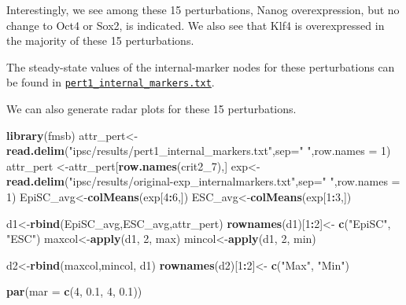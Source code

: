 \documentclass[
]{book}
\newenvironment{Shaded}{\begin{snugshade}}{\end{snugshade}}
\newcommand{\DataTypeTok}[1]{\textcolor[rgb]{0.13,0.29,0.53}{#1}}
\newcommand{\DecValTok}[1]{\textcolor[rgb]{0.00,0.00,0.81}{#1}}
\newcommand{\FloatTok}[1]{\textcolor[rgb]{0.00,0.00,0.81}{#1}}
\newcommand{\KeywordTok}[1]{\textcolor[rgb]{0.13,0.29,0.53}{\textbf{#1}}}
\newcommand{\NormalTok}[1]{#1}
\newcommand{\OperatorTok}[1]{\textcolor[rgb]{0.81,0.36,0.00}{\textbf{#1}}}
\newcommand{\StringTok}[1]{\textcolor[rgb]{0.31,0.60,0.02}{#1}}
\begin{document}
Interestingly, we see among these 15 perturbations, Nanog overexpression, but no change to Oct4 or Sox2, is indicated. We also see that Klf4 is overexpressed in the majority of these 15 perturbations.

The steady-state values of the internal-marker nodes for these perturbations can be found in \href{https://github.com/VeraLiconaResearchGroup/Netisce/blob/main/ipsc_validation/results/pert1_internal_markers.txt}{\texttt{pert1\_internal\_markers.txt}}.

We can also generate radar plots for these 15 perturbations.

\begin{Shaded}
\begin{Highlighting}[]
\KeywordTok{library}\NormalTok{(fmsb)}
\NormalTok{attr_pert<-}\KeywordTok{read.delim}\NormalTok{(}\StringTok{"ipsc/results/pert1_internal_markers.txt"}\NormalTok{,}\DataTypeTok{sep=}\StringTok{" "}\NormalTok{,}\DataTypeTok{row.names =} \DecValTok{1}\NormalTok{)}
\NormalTok{attr_pert <-attr_pert[}\KeywordTok{row.names}\NormalTok{(crit2_}\DecValTok{7}\NormalTok{),]}
\NormalTok{exp<-}\KeywordTok{read.delim}\NormalTok{(}\StringTok{"ipsc/results/original-exp_internalmarkers.txt"}\NormalTok{,}\DataTypeTok{sep=}\StringTok{" "}\NormalTok{,}\DataTypeTok{row.names =} \DecValTok{1}\NormalTok{)}
\NormalTok{EpiSC_avg<-}\KeywordTok{colMeans}\NormalTok{(exp[}\DecValTok{4}\OperatorTok{:}\DecValTok{6}\NormalTok{,])}
\NormalTok{ESC_avg<-}\KeywordTok{colMeans}\NormalTok{(exp[}\DecValTok{1}\OperatorTok{:}\DecValTok{3}\NormalTok{,])}

\NormalTok{d1<-}\KeywordTok{rbind}\NormalTok{(EpiSC_avg,ESC_avg,attr_pert)}
\KeywordTok{rownames}\NormalTok{(d1)[}\DecValTok{1}\OperatorTok{:}\DecValTok{2}\NormalTok{]<-}\StringTok{ }\KeywordTok{c}\NormalTok{(}\StringTok{"EpiSC"}\NormalTok{, }\StringTok{"ESC"}\NormalTok{)}
\NormalTok{maxcol<-}\KeywordTok{apply}\NormalTok{(d1, }\DecValTok{2}\NormalTok{, max)}
\NormalTok{mincol<-}\KeywordTok{apply}\NormalTok{(d1, }\DecValTok{2}\NormalTok{, min)}

\NormalTok{d2<-}\KeywordTok{rbind}\NormalTok{(maxcol,mincol, d1)}
\KeywordTok{rownames}\NormalTok{(d2)[}\DecValTok{1}\OperatorTok{:}\DecValTok{2}\NormalTok{]<-}\StringTok{ }\KeywordTok{c}\NormalTok{(}\StringTok{"Max"}\NormalTok{, }\StringTok{"Min"}\NormalTok{)}

\KeywordTok{par}\NormalTok{(}\DataTypeTok{mar =} \KeywordTok{c}\NormalTok{(}\DecValTok{4}\NormalTok{, }\FloatTok{0.1}\NormalTok{, }\DecValTok{4}\NormalTok{, }\FloatTok{0.1}\NormalTok{))}


\end{Highlighting}
\end{Shaded}
\end{document}
